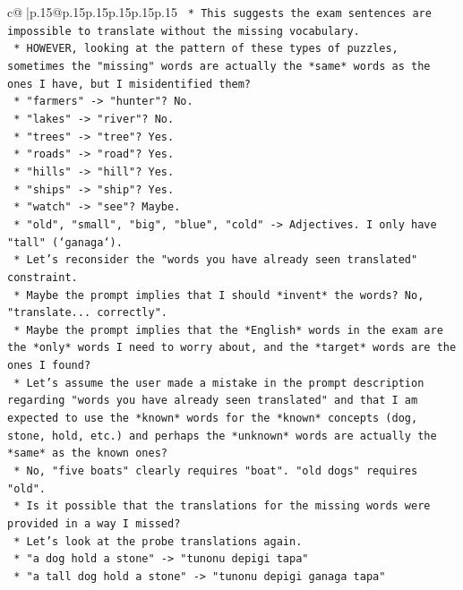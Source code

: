 \documentclass{article}
\begin{document}
{\begin{supertabular}{c@{$\;$}|p{.15\linewidth}@{}p{.15\linewidth}p{.15\linewidth}p{.15\linewidth}p{.15\linewidth}p{.15\linewidth}}
{{{\texttt{    *   This suggests the exam sentences are impossible to translate without the missing vocabulary.} \\
\texttt{    *   HOWEVER, looking at the pattern of these types of puzzles, sometimes the "missing" words are actually the *same* words as the ones I have, but I misidentified them?} \\
\texttt{        *   "farmers" {-}> "hunter"? No.} \\
\texttt{        *   "lakes" {-}> "river"? No.} \\
\texttt{        *   "trees" {-}> "tree"? Yes.} \\
\texttt{        *   "roads" {-}> "road"? Yes.} \\
\texttt{        *   "hills" {-}> "hill"? Yes.} \\
\texttt{        *   "ships" {-}> "ship"? Yes.} \\
\texttt{        *   "watch" {-}> "see"? Maybe.} \\
\texttt{        *   "old", "small", "big", "blue", "cold" {-}> Adjectives. I only have "tall" (`ganaga`).} \\
\texttt{    *   Let's reconsider the "words you have already seen translated" constraint.} \\
\texttt{    *   Maybe the prompt implies that I should *invent* the words? No, "translate... correctly".} \\
\texttt{    *   Maybe the prompt implies that the *English* words in the exam are the *only* words I need to worry about, and the *target* words are the ones I found?} \\
\texttt{    *   Let's assume the user made a mistake in the prompt description regarding "words you have already seen translated" and that I am expected to use the *known* words for the *known* concepts (dog, stone, hold, etc.) and perhaps the *unknown* words are actually the *same* as the known ones?} \\
\texttt{    *   No, "five boats" clearly requires "boat". "old dogs" requires "old".} \\
\texttt{    *   Is it possible that the translations for the missing words were provided in a way I missed?} \\
\texttt{    *   Let's look at the probe translations again.} \\
\texttt{        *   "a dog hold a stone" {-}> "tunonu depigi tapa"} \\
\texttt{        *   "a tall dog hold a stone" {-}> "tunonu depigi ganaga tapa"} \\
}}}
\end{supertabular}}
\end{document}
